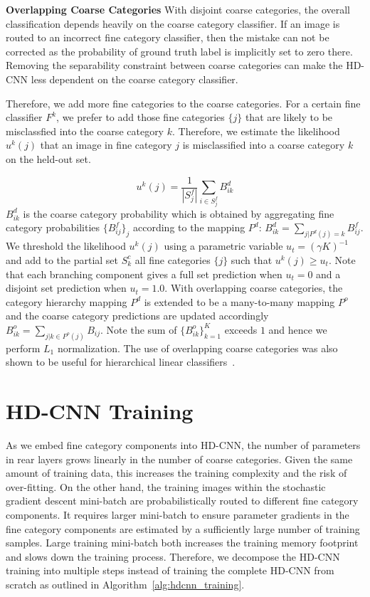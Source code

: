 \documentclass[10pt,twocolumn,letterpaper]{article}
\begin{document}
\noindent \textbf{Overlapping Coarse Categories}
With disjoint coarse categories, the overall classification depends heavily on the coarse category classifier. If an image is routed to an incorrect fine category classifier, then the mistake can not be corrected as the probability of ground truth label is implicitly set to zero there. Removing the separability constraint between coarse categories can make the HD-CNN less dependent on the coarse category classifier. 


Therefore, we add more fine categories to the coarse categories. For a certain fine classifier $F^{k}$, we prefer to add those fine categories $\{j\}$ that are likely to be misclassfied into the coarse category $k$. Therefore, we estimate the likelihood $u^{k}(j)$ that an image in fine category $j$ is misclassified into a coarse category $k$ on the held-out set. 

\vspace{-0.5em}
\begin{equation}
\label{eqn:misclassification_prob}
u^{k}(j)=\frac{1}{\left | S^f_j \right |} \sum_{i\in S^f_j} B^d_{ik}
\end{equation}
$B^d_{ik}$ is the coarse category probability which is obtained by aggregating fine category probabilities $\{B^f_{ij}\}_j$ according to the mapping $P^d$: $B^{d}_{ik}=\sum_{j | P^d(j)=k} B^f_{ij}$. We threshold the likelihood $u^{k}(j)$  
using a parametric variable $ u_t=(\gamma K)^{-1}   $  
and add to the partial set $S^{c}_{k}$ all fine categories $\{j\}$ such that $u^{k}(j)\geq u_t$. 
Note that each branching component gives a full set prediction when $u_t = 0$ and a disjoint set prediction when $u_t = 1.0$. With overlapping coarse categories, the category hierarchy mapping $P^d$ is extended to be a many-to-many mapping $P^o$ and the coarse category predictions are updated accordingly $B^o_{ik}=\sum_{j | k \in P^o(j)} B_{ij}$. Note the sum of $\{B^o_{ik}\}_{k=1}^{K}$ exceeds $1$ and hence we perform $L_1$ normalization. The use of overlapping coarse categories was also shown to be useful for hierarchical linear classifiers~\cite{marszalek2008constructing}.


\section{HD-CNN Training}
\label{sec:training}

As we embed fine category components into HD-CNN, the number of parameters in rear layers grows linearly in the number of coarse categories. Given the same amount of training data, this increases the training complexity and the risk of over-fitting. On the other hand, the training images within the stochastic gradient descent mini-batch are probabilistically routed to different fine category components. It requires larger mini-batch to ensure parameter gradients in the fine category components are estimated by a sufficiently large number of training samples. Large training mini-batch both increases the training memory footprint and slows down the training process. Therefore, we decompose the HD-CNN training into multiple steps instead of training the complete HD-CNN from scratch as outlined in Algorithm~\ref{alg:hdcnn_training}.
\end{document}
